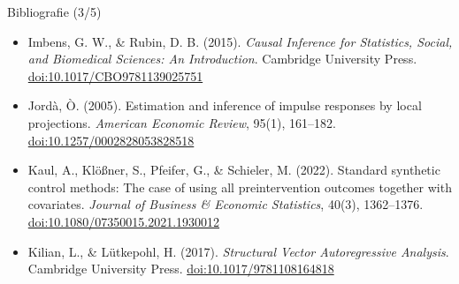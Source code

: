 \begin{frame}{Bibliografie (3/5)}
\begin{itemize}
    \item Imbens, G. W., \& Rubin, D. B. (2015). \textit{Causal Inference for Statistics, Social, and Biomedical Sciences: An Introduction}. Cambridge University Press. \href{https://doi.org/10.1017/CBO9781139025751}{doi:10.1017/CBO9781139025751}
    \item Jordà, Ò. (2005). Estimation and inference of impulse responses by local projections. \textit{American Economic Review}, 95(1), 161--182. \href{https://doi.org/10.1257/0002828053828518}{doi:10.1257/0002828053828518}
    \item Kaul, A., Klößner, S., Pfeifer, G., \& Schieler, M. (2022). Standard synthetic control methods: The case of using all preintervention outcomes together with covariates. \textit{Journal of Business \& Economic Statistics}, 40(3), 1362--1376. \href{https://doi.org/10.1080/07350015.2021.1930012}{doi:10.1080/07350015.2021.1930012}
    \item Kilian, L., \& Lütkepohl, H. (2017). \textit{Structural Vector Autoregressive Analysis}. Cambridge University Press. \href{https://doi.org/10.1017/9781108164818}{doi:10.1017/9781108164818}
\end{itemize}
\end{frame}

